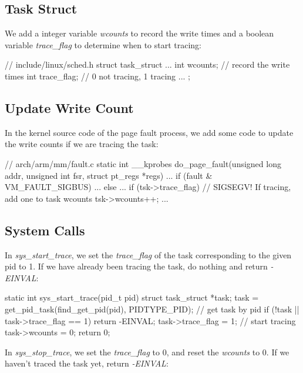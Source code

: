 \subsection{Task Struct}

We add a integer variable \textit{wcounts} to record the write times and a boolean variable \textit{trace\_flag} to determine when to start tracing:

\begin{codeblock}[language=C]
// include/linux/sched.h
struct task_struct {
	... 
	int wcounts; // record the write times	
	int trace_flag;	// 0 not tracing, 1 tracing
  ...
};
\end{codeblock}

\subsection{Update Write Count}

In the kernel source code of the page fault process, we add some code to update the write counts if we are tracing the task:

\begin{codeblock}[language=C]
// arch/arm/mm/fault.c
static int __kprobes
do_page_fault(unsigned long addr, unsigned int fsr, struct pt_regs *regs)
{
    ...
    if (fault & VM_FAULT_SIGBUS) {
		...
	  } else {
	    ... 
		  if (tsk->trace_flag) // SIGSEGV! If tracing, add one to task wcounts	
		  	tsk->wcounts++;
	  }
	  ...
}
\end{codeblock}

\subsection{System Calls}

In \textit{sys\_start\_trace}, we set the \textit{trace\_flag} of the task corresponding to the given pid to 1. If we have already been tracing the task, do nothing and return \textit{-EINVAL}:

\begin{codeblock}[language=C]
static int sys_start_trace(pid_t pid)
{
    struct task_struct *task;
    task = get_pid_task(find_get_pid(pid), PIDTYPE_PID); // get task by pid
    if (!task || task->trace_flag == 1)
        return -EINVAL;
    task->trace_flag = 1; // start tracing
    task->wcounts = 0;
    return 0;
}
\end{codeblock}

In \textit{sys\_stop\_trace}, we set the \textit{trace\_flag} to 0, and reset the \textit{wcounts} to 0. If we haven't traced the task yet, return \textit{-EINVAL}:

